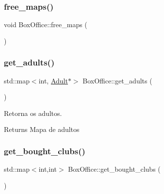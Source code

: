 \subsubsection{\texorpdfstring{free\+\_\+maps()}{free\_maps()}}
{\footnotesize\ttfamily void Box\+Office\+::free\+\_\+maps (\begin{DoxyParamCaption}{ }\end{DoxyParamCaption})}

\mbox{\label{class_box_office_a412e8c12fc95dcc51b94883bbfdfc0d8}} 
\subsubsection{\texorpdfstring{get\+\_\+adults()}{get\_adults()}}
{\footnotesize\ttfamily std\+::map$<$int, \hyperlink{class_adult}{Adult}$\ast$$>$ Box\+Office\+::get\+\_\+adults (\begin{DoxyParamCaption}{ }\end{DoxyParamCaption})\hspace{0.3cm}{\ttfamily [inline]}}



Retorna os adultos. 

\begin{DoxyReturn}{Returns}
Mapa de adultos 
\end{DoxyReturn}
\mbox{\label{class_box_office_a262cc57ff959c0a27b7040e6c81ca62a}} 
\subsubsection{\texorpdfstring{get\+\_\+bought\+\_\+clubs()}{get\_bought\_clubs()}}
{\footnotesize\ttfamily std\+::map$<$int,int$>$ Box\+Office\+::get\+\_\+bought\+\_\+clubs (\begin{DoxyParamCaption}{ }\end{DoxyParamCaption})\hspace{0.3cm}{\ttfamily [inline]}}

\mbox{\label{class_box_office_ab31161c5fb3d48c4928cd0e52e932978}} 
